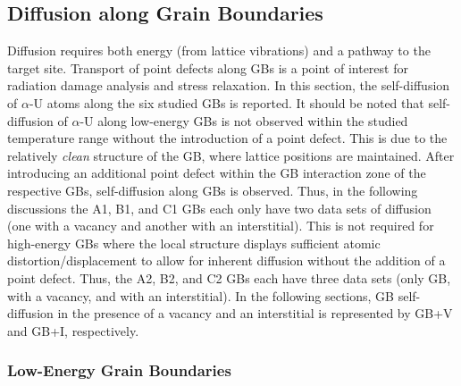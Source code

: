 \documentclass[review]{elsarticle}
\begin{document}
\subsection{Diffusion along Grain Boundaries}
Diffusion requires both energy (from lattice vibrations) and a pathway to the target site. Transport of point defects along GBs is a point of interest for radiation damage analysis and stress relaxation. In this section, the self-diffusion of $\alpha$-U atoms along the six studied GBs is reported. It should be noted that self-diffusion of $\alpha$-U along low-energy GBs is not observed within the studied temperature range without the introduction of a point defect. This is due to the relatively \textit{clean} structure of the GB, where lattice positions are maintained. After introducing an additional point defect within the GB interaction zone of the respective GBs, self-diffusion along GBs is observed. Thus, in the following discussions the A1, B1, and C1 GBs each only have two data sets of diffusion (one with a vacancy and another with an interstitial). This is not required for high-energy GBs where the local structure displays sufficient atomic distortion/displacement to allow for inherent diffusion without the addition of a point defect. Thus, the A2, B2, and C2 GBs each have three data sets (only GB, with a vacancy, and with an interstitial). In the following sections, GB self-diffusion in the presence of a vacancy and an interstitial is represented by GB+V and GB+I, respectively. 


\subsubsection{Low-Energy Grain Boundaries}
\end{document}
